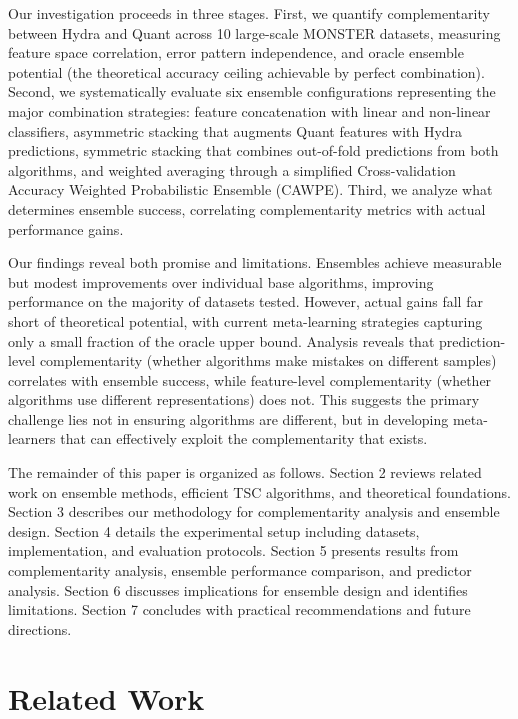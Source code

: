 \documentclass[pdflatex,sn-basic]{sn-jnl}           %
\theoremstyle{thmstyleone}%
\theoremstyle{thmstyletwo}%
\theoremstyle{thmstylethree}%
\begin{document}
Our investigation proceeds in three stages. First, we quantify complementarity between Hydra and Quant across 10 large-scale MONSTER datasets, measuring feature space correlation, error pattern independence, and oracle ensemble potential (the theoretical accuracy ceiling achievable by perfect combination). Second, we systematically evaluate six ensemble configurations representing the major combination strategies: feature concatenation with linear and non-linear classifiers, asymmetric stacking that augments Quant features with Hydra predictions, symmetric stacking that combines out-of-fold predictions from both algorithms, and weighted averaging through a simplified Cross-validation Accuracy Weighted Probabilistic Ensemble (CAWPE). Third, we analyze what determines ensemble success, correlating complementarity metrics with actual performance gains.

Our findings reveal both promise and limitations. Ensembles achieve measurable but modest improvements over individual base algorithms, improving performance on the majority of datasets tested. However, actual gains fall far short of theoretical potential, with current meta-learning strategies capturing only a small fraction of the oracle upper bound. Analysis reveals that prediction-level complementarity (whether algorithms make mistakes on different samples) correlates with ensemble success, while feature-level complementarity (whether algorithms use different representations) does not. This suggests the primary challenge lies not in ensuring algorithms are different, but in developing meta-learners that can effectively exploit the complementarity that exists.

The remainder of this paper is organized as follows. Section 2 reviews related work on ensemble methods, efficient TSC algorithms, and theoretical foundations. Section 3 describes our methodology for complementarity analysis and ensemble design. Section 4 details the experimental setup including datasets, implementation, and evaluation protocols. Section 5 presents results from complementarity analysis, ensemble performance comparison, and predictor analysis. Section 6 discusses implications for ensemble design and identifies limitations. Section 7 concludes with practical recommendations and future directions.

\clearpage

\section{Related Work}\label{sec2}
\end{document}
